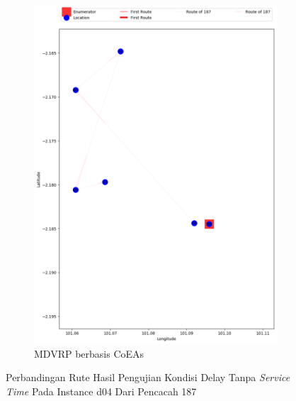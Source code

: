 \begin{figure}[H]
	\centering
	\begin{subfigure}[t]{\textwidth}
		\centering
		\includegraphics[width=\textwidth]{Resources/Images/delayed_4/real_m15_n100_delayed_4_187_coes}
		\caption{MDVRP berbasis CoEAs}
		\label{fig:real_m15_n100_delayed_4_187_coes}
	\end{subfigure}
	\caption{Perbandingan Rute Hasil Pengujian Kondisi Delay Tanpa \textit{Service Time} Pada Instance d04 Dari Pencacah 187}
	\label{fig:real_m15_n100_delayed_4_187}
\end{figure}


